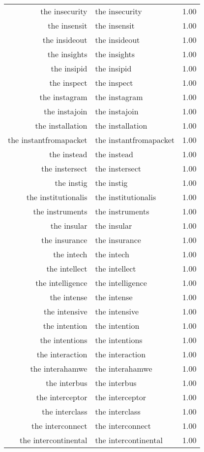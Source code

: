 \begin{table}[ht]
\begin{tabular}{rlr}
  the insecurity & the insecurity & 1.00 \\ 
  the insensit & the insensit & 1.00 \\ 
  the insideout & the insideout & 1.00 \\ 
  the insights & the insights & 1.00 \\ 
  the insipid & the insipid & 1.00 \\ 
  the inspect & the inspect & 1.00 \\ 
  the instagram & the instagram & 1.00 \\ 
  the instajoin & the instajoin & 1.00 \\ 
  the installation & the installation & 1.00 \\ 
  the instantfromapacket & the instantfromapacket & 1.00 \\ 
  the instead & the instead & 1.00 \\ 
  the instersect & the instersect & 1.00 \\ 
  the instig & the instig & 1.00 \\ 
  the institutionalis & the institutionalis & 1.00 \\ 
  the instruments & the instruments & 1.00 \\ 
  the insular & the insular & 1.00 \\ 
  the insurance & the insurance & 1.00 \\ 
  the intech & the intech & 1.00 \\ 
  the intellect & the intellect & 1.00 \\ 
  the intelligence & the intelligence & 1.00 \\ 
  the intense & the intense & 1.00 \\ 
  the intensive & the intensive & 1.00 \\ 
  the intention & the intention & 1.00 \\ 
  the intentions & the intentions & 1.00 \\ 
  the interaction & the interaction & 1.00 \\ 
  the interahamwe & the interahamwe & 1.00 \\ 
  the interbus & the interbus & 1.00 \\ 
  the interceptor & the interceptor & 1.00 \\ 
  the interclass & the interclass & 1.00 \\ 
  the interconnect & the interconnect & 1.00 \\ 
  the intercontinental & the intercontinental & 1.00 \\ 

\end{tabular}
\end{table}
